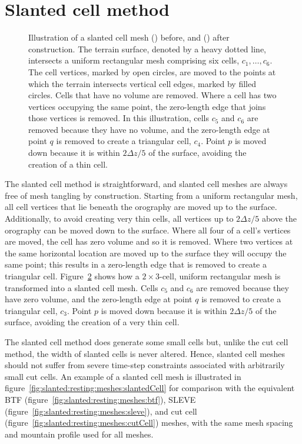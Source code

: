 \section{Slanted cell method}
\label{sec:slanted:method}

\begin{figure}
\centering
\begin{subfigure}{\textwidth}
	\centering
	
	\label{fig:slanted:construct-mesh:before}
	\label{fig:slanted:construct-mesh:after}
\end{subfigure}
\caption{Illustration of a slanted cell mesh
() before, and
() after construction.
	The terrain surface, denoted by a heavy dotted line, intersects a uniform rectangular mesh comprising six cells, $c_1, \ldots, c_6$.
	The cell vertices, marked by open circles, are moved to the points at which the terrain intersects vertical cell edges, marked by filled circles.  Cells that have no volume are removed.  Where a cell has two vertices occupying the same point, the zero-length edge that joins those vertices is removed.
	In this illustration, cells $c_5$ and $c_6$ are removed because they have no volume, and the zero-length edge at point $q$ is removed to create a triangular cell, $c_4$.
	Point $p$ is moved down because it is within $2 \Delta z/5$ of the surface, avoiding the creation of a thin cell.}
\label{fig:slanted:construct-mesh}
\end{figure}

The slanted cell method is straightforward, and slanted cell meshes are always free of mesh tangling by construction.
Starting from a uniform rectangular mesh, all cell vertices that lie beneath the orography are moved up to the surface.
Additionally, to avoid creating very thin cells, all vertices up to $2 \Delta z/5$ above the orography can be moved down to the surface.
Where all four of a cell's vertices are moved, the cell has zero volume and so it is removed.  Where two vertices at the same horizontal location are moved up to the surface they will occupy the same point; this results in a zero-length edge that is removed to create a triangular cell.
Figure~\ref{fig:slanted:construct-mesh} shows how a $2 \times 3$-cell, uniform rectangular mesh is transformed into a slanted cell mesh.  Cells $c_5$ and $c_6$ are removed because they have zero volume, and the zero-length edge at point $q$ is removed to create a triangular cell, $c_3$.
Point $p$ is moved down because it is within $2\Delta z/5$ of the surface, avoiding the creation of a very thin cell.

The slanted cell method does generate some small cells but, unlike the cut cell method, the width of slanted cells is never altered.  Hence, slanted cell meshes should not suffer from severe time-step constraints associated with arbitrarily small cut cells.
An example of a slanted cell mesh is illustrated in figure~\ref{fig:slanted:resting:meshes:slantedCell} for comparison with the equivalent BTF (figure~\ref{fig:slanted:resting:meshes:btf}), SLEVE (figure~\ref{fig:slanted:resting:meshes:sleve}), and cut cell (figure~\ref{fig:slanted:resting:meshes:cutCell}) meshes, with the same mesh spacing and mountain profile used for all meshes.
